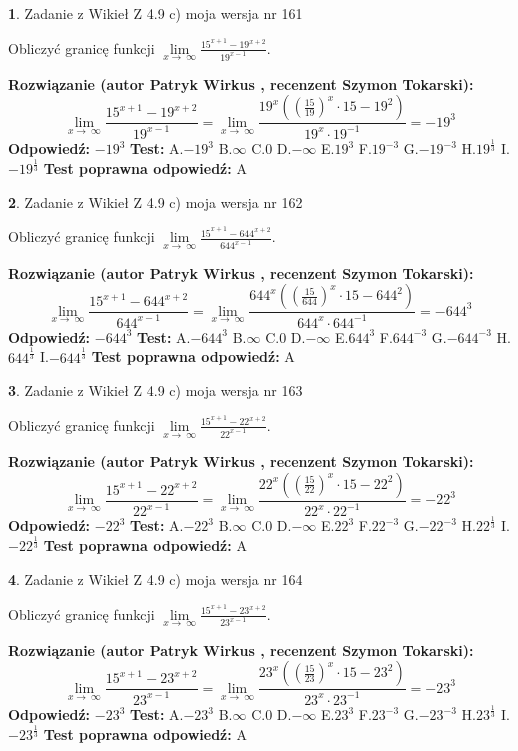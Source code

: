 \documentclass[12pt, a4paper]{article}
\theoremstyle{definition} %
\newtheorem{zad}{}
\newcommand{\zadStart}[1]{\begin{zad}#1\newline}
\newcommand{\zadStop}{\end{zad}}
\newcommand{\rozwStart}[2]{\noindent \textbf{Rozwiązanie (autor #1 , recenzent #2): }\newline}
\newcommand{\rozwStop}{\newline}
\newcommand{\odpStart}{\noindent \textbf{Odpowiedź:}\newline}
\newcommand{\odpStop}{\newline}
\newcommand{\testStart}{\noindent \textbf{Test:}\newline}
\newcommand{\testStop}{\newline}
\newcommand{\kluczStart}{\noindent \textbf{Test poprawna odpowiedź:}\newline}
\newcommand{\kluczStop}{\newline}
\begin{document}
\zadStart{Zadanie z Wikieł Z 4.9 c) moja wersja nr 161}


Obliczyć granicę funkcji  $\lim\limits_{x\to\ \infty}\frac{15^{x+1}-19^{x+2}}{19^{x-1}}$.
\zadStop
\rozwStart{Patryk Wirkus}{Szymon Tokarski}
$$\lim\limits_{x\to\ \infty}\frac{15^{x+1}-19^{x+2}}{19^{x-1}}=\lim\limits_{x\to\ \infty}\frac{19^{x}((\frac{15}{19})^{x}\cdot 15 -19^{2})}{19^{x}\cdot 19^{-1}} = -19^{3}$$
\rozwStop
\odpStart
$-19^{3}$
\odpStop
\testStart
A.$-19^{3}$ B.$\infty$ C.$0$ D.$-\infty$ E.$19^{3}$
F.$19^{-3}$ G.$-19^{-3}$
H.$19^{\frac{1}{3}}$
I.$-19^{\frac{1}{3}}$
\testStop
\kluczStart
A
\kluczStop



\zadStart{Zadanie z Wikieł Z 4.9 c) moja wersja nr 162}


Obliczyć granicę funkcji  $\lim\limits_{x\to\ \infty}\frac{15^{x+1}-644^{x+2}}{644^{x-1}}$.
\zadStop
\rozwStart{Patryk Wirkus}{Szymon Tokarski}
$$\lim\limits_{x\to\ \infty}\frac{15^{x+1}-644^{x+2}}{644^{x-1}}=\lim\limits_{x\to\ \infty}\frac{644^{x}((\frac{15}{644})^{x}\cdot 15 -644^{2})}{644^{x}\cdot 644^{-1}} = -644^{3}$$
\rozwStop
\odpStart
$-644^{3}$
\odpStop
\testStart
A.$-644^{3}$ B.$\infty$ C.$0$ D.$-\infty$ E.$644^{3}$
F.$644^{-3}$ G.$-644^{-3}$
H.$644^{\frac{1}{3}}$
I.$-644^{\frac{1}{3}}$
\testStop
\kluczStart
A
\kluczStop



\zadStart{Zadanie z Wikieł Z 4.9 c) moja wersja nr 163}


Obliczyć granicę funkcji  $\lim\limits_{x\to\ \infty}\frac{15^{x+1}-22^{x+2}}{22^{x-1}}$.
\zadStop
\rozwStart{Patryk Wirkus}{Szymon Tokarski}
$$\lim\limits_{x\to\ \infty}\frac{15^{x+1}-22^{x+2}}{22^{x-1}}=\lim\limits_{x\to\ \infty}\frac{22^{x}((\frac{15}{22})^{x}\cdot 15 -22^{2})}{22^{x}\cdot 22^{-1}} = -22^{3}$$
\rozwStop
\odpStart
$-22^{3}$
\odpStop
\testStart
A.$-22^{3}$ B.$\infty$ C.$0$ D.$-\infty$ E.$22^{3}$
F.$22^{-3}$ G.$-22^{-3}$
H.$22^{\frac{1}{3}}$
I.$-22^{\frac{1}{3}}$
\testStop
\kluczStart
A
\kluczStop



\zadStart{Zadanie z Wikieł Z 4.9 c) moja wersja nr 164}


Obliczyć granicę funkcji  $\lim\limits_{x\to\ \infty}\frac{15^{x+1}-23^{x+2}}{23^{x-1}}$.
\zadStop
\rozwStart{Patryk Wirkus}{Szymon Tokarski}
$$\lim\limits_{x\to\ \infty}\frac{15^{x+1}-23^{x+2}}{23^{x-1}}=\lim\limits_{x\to\ \infty}\frac{23^{x}((\frac{15}{23})^{x}\cdot 15 -23^{2})}{23^{x}\cdot 23^{-1}} = -23^{3}$$
\rozwStop
\odpStart
$-23^{3}$
\odpStop
\testStart
A.$-23^{3}$ B.$\infty$ C.$0$ D.$-\infty$ E.$23^{3}$
F.$23^{-3}$ G.$-23^{-3}$
H.$23^{\frac{1}{3}}$
I.$-23^{\frac{1}{3}}$
\testStop
\kluczStart
A
\kluczStop
\end{document}
